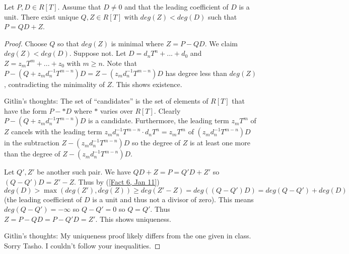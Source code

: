 \begin{prop} \label{Prop 4, Jan 13}
Let $P,D \in R[T]$.  Assume that $D \neq 0$ and that the leading coefficient of $D$ is a unit.  There exist unique $Q,Z \in R[T]$ with $deg(Z) < deg(D)$ such that $P = QD+Z$.
\end{prop}

\begin{proof}\hspace{0.5cm}

Choose $Q$ so that $deg(Z)$ is minimal where $Z = P-QD$.  We claim $deg(Z) < deg(D)$.  Suppose not.  Let $D = d_nT^n + ... + d_0$ and $Z = z_mT^m + ... + z_0$ with $m \geq n$.  Note that $P-(Q+z_md_n^{-1}T^{m-n})D = Z - (z_md_n^{-1}T^{m-n})D$ has degree less than $deg(Z)$, contradicting the minimality of $Z$.  This shows existence.

Gitlin's thoughts:  The set of ``candidates'' is the set of elements of $R[T]$ that have the form $P-*D$ where $*$ varies over $R[T]$.  Clearly $P-(Q+z_md_n^{-1}T^{m-n})D$ is a candidate.  Furthermore, the leading term $z_mT^m$ of $Z$ cancels with the leading term $z_md_n^{-1}T^{m-n} \cdot d_nT^n = z_mT^m$ of $(z_md_n^{-1}T^{m-n})D$ in the subtraction $Z - (z_md_n^{-1}T^{m-n})D$ so the degree of $Z$ is at least one more than the degree of $Z - (z_md_n^{-1}T^{m-n})D$.

Let $Q',Z'$ be another such pair.  We have $QD+Z = P = Q'D+Z'$ so $(Q-Q')D = Z'-Z$.  Thus by (\ref{Fact 6, Jan 11}) $deg(D) > \max(deg(Z'),deg(Z)) \geq deg(Z'-Z) = deg((Q-Q')D) = deg(Q-Q') + deg(D)$ (the leading coefficient of $D$ is a unit and thus not a divisor of zero).  This means $deg(Q-Q') = - \infty$ so $Q-Q' = 0$ so $Q= Q'$.  Thus $Z = P-QD = P-Q'D = Z'$.  This shows uniqueness.

Gitlin's thoughts:  My uniqueness proof likely differs from the one given in class.  Sorry Tasho.  I couldn't follow your inequalities.

\end{proof}
